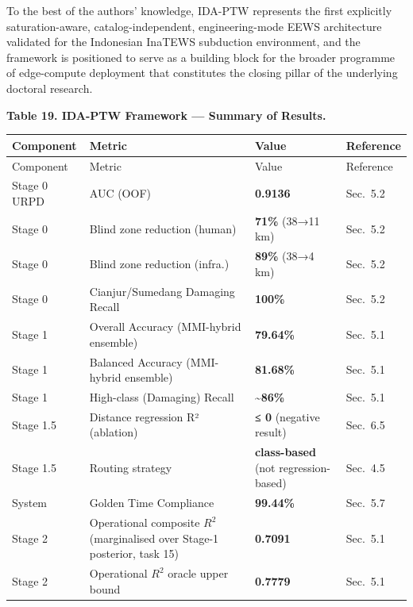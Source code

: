 \documentclass[10pt]{article}
\begin{document}
To the best of the authors' knowledge, IDA-PTW represents the first explicitly saturation-aware, catalog-independent, engineering-mode EEWS architecture validated for the Indonesian InaTEWS subduction environment, and the framework is positioned to serve as a building block for the broader programme of edge-compute deployment that constitutes the closing pillar of the underlying doctoral research.

\par\vspace{16pt}\noindent\begingroup\centering\fontsize{8}{10}\selectfont\textbf{Table 19. IDA-PTW Framework --- Summary of Results.}\par\endgroup\vspace{6pt}
\begin{longtable}[]{@{}>{\raggedright\arraybackslash}p{2cm}>{\raggedright\arraybackslash}p{4cm}>{\centering\arraybackslash}p{2.5cm}>{\raggedright\arraybackslash}p{3.5cm}@{}}
\toprule
Component & Metric & Value & Reference \\
\midrule
\endfirsthead
\toprule
Component & Metric & Value & Reference \\
\midrule
\endhead
\bottomrule
\endlastfoot
Stage 0 URPD & AUC (OOF) & \textbf{0.9136} & Sec.~5.2 \\
Stage 0 & Blind zone reduction (human) & \textbf{71\%} (38→11 km) & Sec.~5.2 \\
Stage 0 & Blind zone reduction (infra.) & \textbf{89\%} (38→4 km) & Sec.~5.2 \\
Stage 0 & Cianjur/Sumedang Damaging Recall & \textbf{100\%} & Sec.~5.2 \\
Stage 1 & Overall Accuracy (MMI-hybrid ensemble) & \textbf{79.64\%} & Sec.~5.1 \\
Stage 1 & Balanced Accuracy (MMI-hybrid ensemble) & \textbf{81.68\%} & Sec.~5.1 \\
Stage 1 & High-class (Damaging) Recall & \textbf{\textasciitilde86\%} & Sec.~5.1 \\
Stage 1.5 & Distance regression R² (ablation) & \textbf{≤ 0} (negative result) & Sec.~6.5 \\
Stage 1.5 & Routing strategy & \textbf{class-based} (not regression-based) & Sec.~4.5 \\
System & Golden Time Compliance & \textbf{99.44\%} & Sec.~5.7 \\
Stage 2 & Operational composite \(R^2\) (marginalised over Stage-1 posterior, task 15) & \textbf{0.7091} & Sec.~5.1 \\
Stage 2 & Operational \(R^2\) oracle upper bound & \textbf{0.7779} & Sec.~5.1 \\

\end{longtable}
\end{document}
